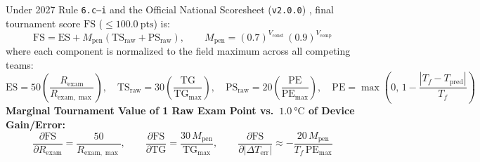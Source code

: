 \begin{formulacard}
Under 2027 Rule \texttt{6.c--i} and the Official National Scoresheet (\texttt{v2.0.0}) , final tournament score $\mathrm{FS}$ ($\le \SI{100.0}{\text{pts}}$) is:
\begin{equation}\label{eq:21:fs}
  \mathrm{FS} = \mathrm{ES} + M_{\mathrm{pen}}\left(\mathrm{TS}_{\mathrm{raw}} + \mathrm{PS}_{\mathrm{raw}}\right), \qquad M_{\mathrm{pen}} = (0.7)^{V_{\mathrm{const}}}\,(0.9)^{V_{\mathrm{comp}}}
\end{equation}
where each component is normalized to the field maximum across all competing teams:
\begin{equation}\label{eq:21:norm}
  \mathrm{ES} = 50\left(\frac{R_{\mathrm{exam}}}{R_{\mathrm{exam,\max}}}\right), \quad
  \mathrm{TS}_{\mathrm{raw}} = 30\left(\frac{\mathrm{TG}}{\mathrm{TG}_{\max}}\right), \quad
  \mathrm{PS}_{\mathrm{raw}} = 20\left(\frac{\mathrm{PE}}{\mathrm{PE}_{\max}}\right), \quad
  \mathrm{PE} = \max\!\left(0,\,1 - \frac{|T_f - T_{\mathrm{pred}}|}{T_f}\right)
\end{equation}
\textbf{Marginal Tournament Value of 1 Raw Exam Point vs.\ $\SI{1.0}{\celsius}$ of Device Gain/Error:}
\begin{equation}\label{eq:21:marginal}
  \frac{\partial \mathrm{FS}}{\partial R_{\mathrm{exam}}} = \frac{50}{R_{\mathrm{exam,\max}}}, \qquad
  \frac{\partial \mathrm{FS}}{\partial \mathrm{TG}} = \frac{30\,M_{\mathrm{pen}}}{\mathrm{TG}_{\max}}, \qquad
  \frac{\partial \mathrm{FS}}{\partial |\Delta T_{\mathrm{err}}|} \approx -\frac{20\,M_{\mathrm{pen}}}{T_f\,\mathrm{PE}_{\max}}
\end{equation}
\end{formulacard}

